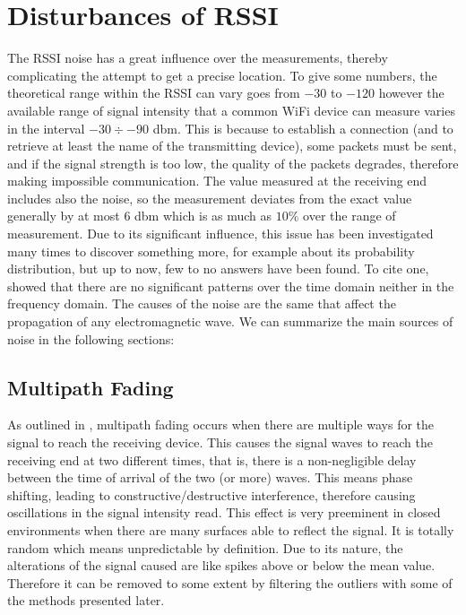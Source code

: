 \documentclass[12pt,twoside]{report}
\begin{document}
\chapter{Disturbances of RSSI}
The RSSI noise has a great influence over the measurements, thereby complicating the attempt to get a precise location. To give some numbers, the theoretical range within the RSSI can vary goes from $-30$ to $-120$ however the available range of signal intensity that a common WiFi device can measure varies in the interval $-30\div-90$ dbm. This is because to establish a connection (and to retrieve at least the name of the transmitting device), some packets must be sent, and if the signal strength is too low, the quality of the packets degrades, therefore making impossible communication. The value measured at the receiving end includes also the noise, so the measurement deviates from the exact value generally by at most $6$ dbm which is as much as $10\%$ over the range of measurement.
Due to its significant influence, this issue has been investigated many times to discover something more, for example about its probability distribution, but up to now, few to no answers have been found. To cite one, \cite{4608603} showed that there are no significant patterns over the time domain neither in the frequency domain. The causes of the noise are the same that affect the propagation of any electromagnetic wave. We can summarize the main sources of noise in the following sections: 
\section{Multipath Fading} 
As outlined in \cite{onl11}, multipath fading occurs when there are multiple ways for the signal to reach the receiving device. This causes the signal waves to reach the receiving end at two different times, that is, there is a non-negligible delay between the time of arrival of the two (or more) waves. This means phase shifting, leading to constructive/destructive interference, therefore causing oscillations in the signal intensity read. This effect is very preeminent in closed environments when there are many surfaces able to reflect the signal. It is totally random \cite{10.5555/559977} which means unpredictable by definition. Due to its nature, the alterations of the signal caused are like spikes above or below the mean value. Therefore it can be removed to some extent by filtering the outliers with some of the methods presented later.
\end{document}
